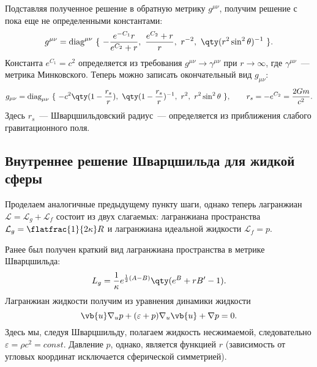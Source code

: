 \documentclass[\docroot/reports/draft/report.tex]{subfiles}
\begin{document}
    Подставляя полученное решение в обратную метрику $g^{\mu\nu}$, получим решение с пока еще не определенными константами:
    \begin{equation*}
        g^{\mu\nu} = \text{diag}^{\mu\nu}\ \{\
            -\frac{e^{-C_1} r}{e^{C_2} + r},\
            \frac{e^{C_2} + r}{r},\
            r^{-2},\
            \qty(r^2 \sin^2\theta)^{-1}
        \ \} .
    \end{equation*}
    Константа $e^{C_1} = c^2$ определяется из требования $g^{\mu\nu} \to \gamma^{\mu\nu}$ при $r \to \infty$, где $\gamma^{\mu\nu}$~--- метрика Минковского. Теперь можно записать окончательный вид $g_{\mu\nu}$:
    \begin{equation*}
        g_{\mu\nu} = \text{diag}_{\mu\nu}\ \{\
            - c^2 \qty(1 - \frac{r_s}{r}),\
            \qty(1 - \frac{r_s}{r})^{-1},\
            r^2,\
            r^2 \sin^2\theta
        \ \} , \qquad r_s = - e^{C_2} = \frac{2 G m}{c^2} .
    \end{equation*}
    Здесь $r_s$~--- Шварцшильдовский радиус~--- определяется из приближения слабого гравитационного поля.

\subsection{Внутреннее решение Шварцшильда для жидкой сферы}

    Проделаем аналогичные предыдущему пункту шаги, однако теперь лагранжиан $\mathcal{L} = \mathcal{L}_g + \mathcal{L}_f$ состоит из двух слагаемых: лагранжиана пространства $\mathcal{L}_g = \flatfrac{1}{2 \kappa} R$ и лагранжиана идеальной жидкости $\mathcal{L}_f = p$.

    Ранее был получен краткий вид лагранжиана пространства в метрике Шварцшильда:
    \begin{equation*}
        L_g = \frac{1}{\kappa} e^{\frac{1}{2} (A - B)} \qty(e^B + r B' - 1) .
    \end{equation*}
    Лагранжиан жидкости получим из уравнения динамики жидкости
    \begin{equation*}
        \vb{u} \nabla_u p + (\varepsilon + p) \nabla_u \vb{u} + \nabla p = 0 .
    \end{equation*}
    Здесь мы, следуя Шварцшильду, полагаем жидкость несжимаемой, следовательно $\varepsilon = \rho c^2 = const$. Давление $p$, однако, является функцией $r$ (зависимость от угловых координат исключается сферической симметрией).
\end{document}
